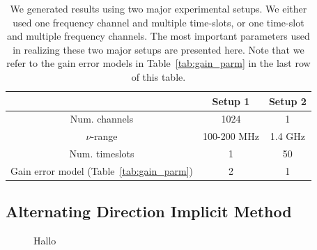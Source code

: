 \documentclass[useAMS,usenatbib]{mn2e}
\begin{document}
\begin{table}
\centering
\caption{We generated results using two major experimental setups. We either used one frequency channel and multiple time-slots, or one time-slot and multiple frequency 
channels. The most important parameters used in realizing these two major setups are presented here. Note that we refer to the gain error models in Table~\ref{tab:gain_parm} in the 
last row of this table.}
\begin{tabular}{|c c c|} 
\hline
 & Setup 1 & Setup 2\\
\hline
\hline
 Num. channels & 1024 & 1\\
$\nu$-range & 100-200 MHz & 1.4 GHz\\
Num. timeslots & 1 & 50\\
Gain error model (Table~\ref{tab:gain_parm}) & 2 & 1\\
\hline
\end{tabular}
\label{tab:ch_parm}
\end{table}

\subsection{Alternating Direction Implicit Method}

\begin{figure}
\centering
{}
\caption{Hallo
\label{fig:hessian}} 
\end{figure}
\end{document}
